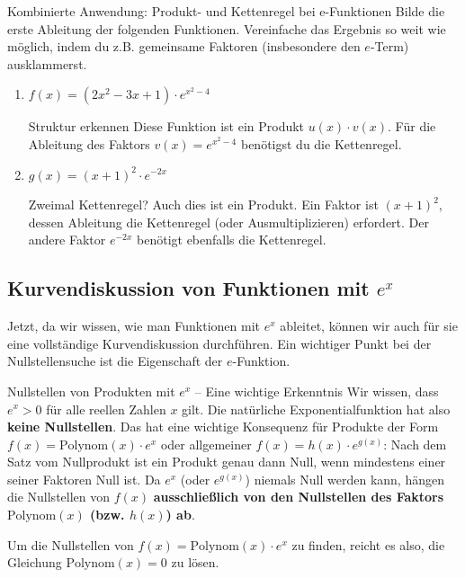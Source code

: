 \begin{aufgabenumgebung}{Kombinierte Anwendung: Produkt- und Kettenregel bei e-Funktionen}
Bilde die erste Ableitung der folgenden Funktionen. Vereinfache das Ergebnis so weit wie möglich, indem du z.B. gemeinsame Faktoren (insbesondere den $e$-Term) ausklammerst.
\begin{enumerate}
    \item $f(x) = (2x^2 - 3x + 1) \cdot e^{x^2 - 4}$
        \begin{tippumgebung}{Struktur erkennen}
        Diese Funktion ist ein Produkt $u(x) \cdot v(x)$. Für die Ableitung des Faktors $v(x)=e^{x^2-4}$ benötigst du die Kettenregel.
        \end{tippumgebung}
    \item $g(x) = (x+1)^2 \cdot e^{-2x}$
        \begin{tippumgebung}{Zweimal Kettenregel?}
        Auch dies ist ein Produkt. Ein Faktor ist $(x+1)^2$, dessen Ableitung die Kettenregel (oder Ausmultiplizieren) erfordert. Der andere Faktor $e^{-2x}$ benötigt ebenfalls die Kettenregel.
        \end{tippumgebung}
\end{enumerate}
\end{aufgabenumgebung}


\subsection{Kurvendiskussion von Funktionen mit $e^x$}
\label{subsec:kurvendiskussion_ex}

Jetzt, da wir wissen, wie man Funktionen mit $e^x$ ableitet, können wir auch für sie eine vollständige Kurvendiskussion durchführen. Ein wichtiger Punkt bei der Nullstellensuche ist die Eigenschaft der $e$-Funktion.

\begin{infoboxumgebung}{Nullstellen von Produkten mit $e^x$ – Eine wichtige Erkenntnis}
Wir wissen, dass $e^x > 0$ für alle reellen Zahlen $x$ gilt. Die natürliche Exponentialfunktion hat also \textbf{keine Nullstellen}.
Das hat eine wichtige Konsequenz für Produkte der Form $f(x) = \text{Polynom}(x) \cdot e^x$ oder allgemeiner $f(x) = h(x) \cdot e^{g(x)}$:
Nach dem Satz vom Nullprodukt ist ein Produkt genau dann Null, wenn mindestens einer seiner Faktoren Null ist. Da $e^x$ (oder $e^{g(x)}$) niemals Null werden kann, hängen die Nullstellen von $f(x)$ \textbf{ausschließlich von den Nullstellen des Faktors $\text{Polynom}(x)$ (bzw. $h(x)$) ab}.

Um die Nullstellen von $f(x) = \text{Polynom}(x) \cdot e^x$ zu finden, reicht es also, die Gleichung $\text{Polynom}(x) = 0$ zu lösen.
\end{infoboxumgebung}

